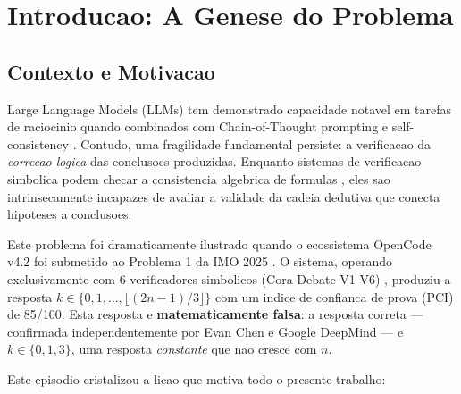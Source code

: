 \documentclass[5p]{elsarticle}
\begin{document}
\newpage
\tableofcontents
\newpage

\section{Introducao: A Genese do Problema}

\subsection{Contexto e Motivacao}

Large Language Models (LLMs) tem demonstrado capacidade notavel em tarefas de
raciocinio quando combinados com Chain-of-Thought prompting \cite{wei2022} e
self-consistency \cite{wang2023}. Contudo, uma fragilidade fundamental persiste:
a verificacao da \textit{correcao logica} das conclusoes produzidas. Enquanto
sistemas de verificacao simbolica podem checar a consistencia algebrica de
formulas \cite{meurer2017}, eles sao intrinsecamente incapazes de avaliar a
validade da cadeia dedutiva que conecta hipoteses a conclusoes.

Este problema foi dramaticamente ilustrado quando o ecossistema OpenCode v4.2
\cite{opencode2026} foi submetido ao Problema 1 da IMO 2025 \cite{imo2025}.
O sistema, operando exclusivamente com 6 verificadores simbolicos (Cora-Debate
V1-V6) \cite{cora2026}, produziu a resposta $k\in\{0,1,\dots,\lfloor(2n-1)/3\rfloor\}$
com um indice de confianca de prova (PCI) de 85/100. Esta resposta e
\textbf{matematicamente falsa}: a resposta correta --- confirmada independentemente
por Evan Chen \cite{chen2025} e Google DeepMind \cite{deepmind2025} --- e
$k\in\{0,1,3\}$, uma resposta \textit{constante} que nao cresce com $n$.

Este episodio cristalizou a licao que motiva todo o presente trabalho:

\begin{center}
\end{center}
\end{document}
